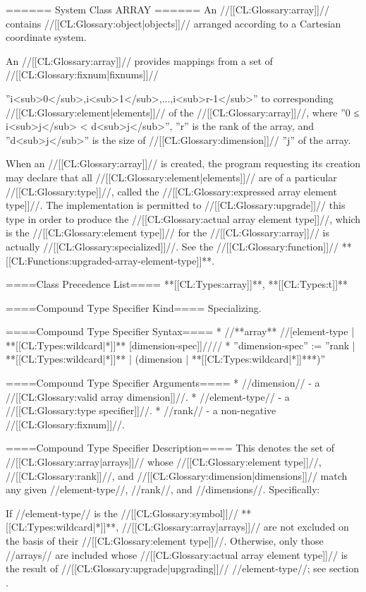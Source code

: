 ====== System Class ARRAY ======
An //[[CL:Glossary:array]]// contains //[[CL:Glossary:object|objects]]// arranged according to a Cartesian coordinate system.

An //[[CL:Glossary:array]]// provides mappings from a set of //[[CL:Glossary:fixnum|fixnums]]//

''{i<sub>0</sub>,i<sub>1</sub>,...,i<sub>r-1</sub>}'' to corresponding //[[CL:Glossary:element|elements]]// of the //[[CL:Glossary:array]]//, where ''0 ≤ i<sub>j</sub> < d<sub>j</sub>'', ''r'' is the rank of the array, and ''d<sub>j</sub>'' is the size of //[[CL:Glossary:dimension]]// ''j'' of the array.

When an //[[CL:Glossary:array]]// is created, the program requesting its creation may declare that all //[[CL:Glossary:element|elements]]// are of a particular //[[CL:Glossary:type]]//, called the //[[CL:Glossary:expressed array element type]]//. The implementation is permitted to //[[CL:Glossary:upgrade]]// this type in order to produce the //[[CL:Glossary:actual array element type]]//, which is the //[[CL:Glossary:element type]]// for the //[[CL:Glossary:array]]// is actually //[[CL:Glossary:specialized]]//. See the //[[CL:Glossary:function]]// **[[CL:Functions:upgraded-array-element-type]]**.

====Class Precedence List====
**[[CL:Types:array]]**, **[[CL:Types:t]]**

====Compound Type Specifier Kind====
Specializing.

====Compound Type Specifier Syntax====
  * //**array** //[{element-type | **[[CL:Types:wildcard|*]]**} [dimension-spec]]////
  * ''dimension-spec'' := ''rank | **[[CL:Types:wildcard|*]]** | ({dimension | **[[CL:Types:wildcard|*]]**}*)''

====Compound Type Specifier Arguments====
  * //dimension// - a //[[CL:Glossary:valid array dimension]]//.
  * //element-type// - a //[[CL:Glossary:type specifier]]//.
  * //rank// - a non-negative //[[CL:Glossary:fixnum]]//.

====Compound Type Specifier Description====
This denotes the set of //[[CL:Glossary:array|arrays]]// whose //[[CL:Glossary:element type]]//, //[[CL:Glossary:rank]]//, and //[[CL:Glossary:dimension|dimensions]]// match any given //element-type//, //rank//, and //dimensions//. Specifically:

If //element-type// is the //[[CL:Glossary:symbol]]// **[[CL:Types:wildcard|*]]**, //[[CL:Glossary:array|arrays]]// are not excluded on the basis of their //[[CL:Glossary:element type]]//. Otherwise, only those //arrays// are included whose //[[CL:Glossary:actual array element type]]// is the result of //[[CL:Glossary:upgrade|upgrading]]// //element-type//; see section {\secref\ArrayUpgrading}.

